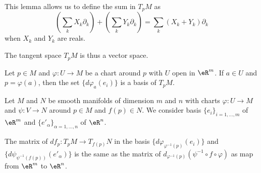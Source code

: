 This lemma allows us to define the sum in \( T_pM\) as      %
\begin{equation}
    \left( \sum_kX_k\partial_k \right)+\left( \sum_kY_k\partial_k \right)=\sum_k (X_k+Y_k)\partial_k
\end{equation}
when \( X_k\) and \( Y_k\) are reals.

The tangent space \( T_pM\) is thus a vector space.

\begin{proposition}     \label{PROPooWXNDooPeORjA}
    Let \( p\in M\) and \( \varphi\colon U\to M\) be a chart around \( p\) with \( U\) open in \( \eR^m\). If \( a\in U\) and \( p=\varphi(a)\), then  the set \( \{  d\varphi_a(e_i) \}\) is a basis of \( T_pM\).
\end{proposition}

\begin{lemma}       \label{LEMooVCSJooEuDZFz}
    Let \( M\) and \( N\) be smooth manifolds of dimension \( m\) and \( n\) with charts \( \varphi\colon U\to M\) and \( \psi\colon V\to N\) around \( p\in M\) and \( f(p)\in N\). We consider basis \( \{ e_i \}_{i=1,\ldots, m}\) of \( \eR^m\) and \( \{ e'_{\alpha} \}_{\alpha=1,\ldots, n}\) of \( \eR^n\).

    The matrix of \( df_p\colon T_pM\to T_{f(p)}N\) in the basis \( \{ d\varphi_{\varphi^{-1}(p)}(e_i) \}\) and \( \{ d\psi_{\psi^{-1}(f(p))}(e'_{\alpha}) \}\) is the same as the matrix of \( d_{\varphi^{-1}(p)}(\psi^{-1}\circ f\circ\varphi)\) as map from \( \eR^m\) to \( \eR^n\).
\end{lemma}

